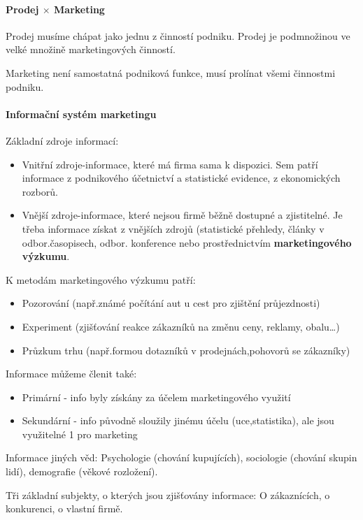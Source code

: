 \documentclass[11pt,a4paper,twoside]{book}
\begin{document}
	\paragraph*{Prodej $\times$ Marketing}
	Prodej musíme chápat jako jednu z činností podniku. Prodej je podmnožinou ve velké množině marketingových činností.
	
	Marketing není samostatná podniková funkce, musí prolínat všemi činnostmi podniku.

	\paragraph*{Informační systém marketingu}
		Základní zdroje informací:
		\begin{itemize}
			\item Vnitřní zdroje-informace, které má firma sama k dispozici. Sem patří informace z podnikového účetnictví a statistické evidence, z ekonomických rozborů.
			\item Vnější zdroje-informace, které nejsou firmě běžně dostupné a zjistitelné. Je třeba informace získat z vnějších zdrojů (statistické přehledy, články v odbor.časopisech, odbor. konference nebo prostřednictvím \textbf{marketingového výzkumu}.
		\end{itemize}

	K metodám marketingového výzkumu patří:
	\begin{itemize}
		\item Pozorování (např.známé počítání aut u cest pro zjištění průjezdnosti)
		\item Experiment (zjišťování reakce zákazníků na změnu ceny, reklamy, obalu\ldots)
		\item Průzkum trhu (např.formou dotazníků v prodejnách,pohovorů se zákazníky)
	\end{itemize}

	Informace můžeme členit také:
	\begin{itemize}
		\item Primární - info byly získány za účelem marketingového využití
		\item Sekundární - info původně sloužily jinému účelu (uce,statistika), ale jsou využitelné 1 pro marketing
	\end{itemize}

	Informace jiných věd:
	Psychologie (chování kupujících), sociologie (chování skupin lidí), demografie (věkové rozložení).

	Tři základní subjekty, o kterých jsou zjišťovány informace:
	O zákaznících, o konkurenci, o vlastní firmě.
	
\end{document}
